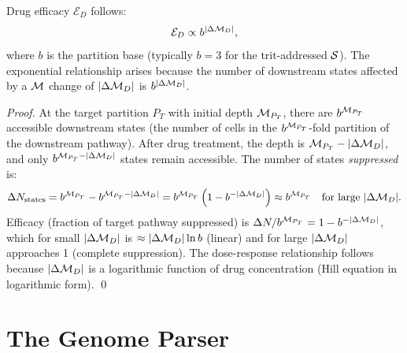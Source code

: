 \begin{proposition}
\label{prop:efficacy_partition}
Drug efficacy $\mathcal{E}_D$ follows:
\begin{equation}
  \mathcal{E}_D \propto b^{|\Delta\mathcal{M}_D|},
  \label{eq:efficacy_exponential}
\end{equation}
where $b$ is the partition base (typically $b = 3$ for the trit-addressed
$\mathcal{S}$). The exponential relationship arises because the number of
downstream states affected by a $\mathcal{M}$ change of $|\Delta\mathcal{M}_D|$ is
$b^{|\Delta\mathcal{M}_D|}$.
\end{proposition}

\begin{proof}
At the target partition $P_T$ with initial depth $\mathcal{M}_{P_T}$, there are
$b^{\mathcal{M}_{P_T}}$ accessible downstream states (the number of cells in the
$b^{\mathcal{M}_{P_T}}$-fold partition of the downstream pathway). After drug
treatment, the depth is $\mathcal{M}_{P_T} - |\Delta\mathcal{M}_D|$, and only
$b^{\mathcal{M}_{P_T} - |\Delta\mathcal{M}_D|}$ states remain accessible. The number of
states \emph{suppressed} is:
\begin{equation}
  \Delta N_{\mathrm{states}} = b^{\mathcal{M}_{P_T}} - b^{\mathcal{M}_{P_T} - |\Delta\mathcal{M}_D|}
  = b^{\mathcal{M}_{P_T}} \left(1 - b^{-|\Delta\mathcal{M}_D|}\right)
  \approx b^{\mathcal{M}_{P_T}} \quad \text{for large } |\Delta\mathcal{M}_D|.
\end{equation}
Efficacy (fraction of target pathway suppressed) is $\Delta N / b^{\mathcal{M}_{P_T}}
= 1 - b^{-|\Delta\mathcal{M}_D|}$, which for small $|\Delta\mathcal{M}_D|$ is
$\approx |\Delta\mathcal{M}_D| \ln b$ (linear) and for large $|\Delta\mathcal{M}_D|$
approaches 1 (complete suppression). The dose-response relationship
follows because $|\Delta\mathcal{M}_D|$ is a logarithmic function of drug
concentration (Hill equation in logarithmic form). \qed
\end{proof}

\section{The Genome Parser}
\label{sec:genome_parser}

